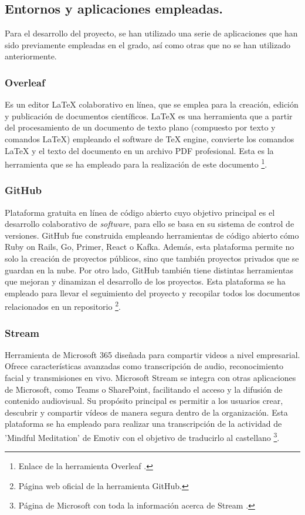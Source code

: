 \subsection{Entornos y aplicaciones empleadas.}
Para el desarrollo del proyecto, se han utilizado una serie de aplicaciones que han sido previamente empleadas en el grado, así como otras que no se han utilizado anteriormente.

\subsubsection{Overleaf}
Es un editor LaTeX colaborativo en línea, que se emplea para la creación, edición y publicación de documentos científicos. LaTeX es una herramienta que a partir del procesamiento de un documento de texto plano (compuesto por texto y comandos LaTeX) empleando el software de TeX engine, convierte los comandos LaTeX y el texto del documento en un archivo PDF profesional. Esta es la herramienta que se ha empleado para la realización de este documento \cite{overleaf}\footnote{Enlace de la herramienta Overleaf \cite{overleaf}.}.

\subsubsection{GitHub}
Plataforma gratuita en línea de código abierto cuyo objetivo principal es el desarrollo colaborativo de \textit{software}, para ello se basa en su sistema de control de versiones. GitHub fue construida empleando herramientas de código abierto cómo Ruby on Rails, Go, Primer, React o Kafka. Además, esta plataforma permite no solo la creación de proyectos públicos, sino que también proyectos privados que se guardan en la nube. Por otro lado, GitHub también tiene distintas herramientas que mejoran y dinamizan el desarrollo de los proyectos. Esta plataforma se ha empleado para llevar el seguimiento del proyecto y recopilar todos los documentos relacionados en un repositorio \cite{GitHub}\footnote{Página web oficial de la herramienta GitHub\cite{GitHub}.}.

\subsubsection{Stream}
Herramienta de Microsoft 365 diseñada para compartir videos a nivel empresarial. Ofrece características avanzadas como transcripción de audio, reconocimiento facial y transmisiones en vivo. Microsoft Stream se integra con otras aplicaciones de Microsoft, como Teams o SharePoint, facilitando el acceso y la difusión de contenido audiovisual. Su propósito principal es permitir a los usuarios crear, descubrir y compartir vídeos de manera segura dentro de la organización. Esta plataforma se ha empleado para realizar una transcripción de la actividad de 'Mindful Meditation' de Emotiv con el objetivo de traducirlo al castellano \cite{MicrosoftStream}\footnote{Página de Microsoft con toda la información acerca de Stream \cite{MicrosoftStream}.}.


